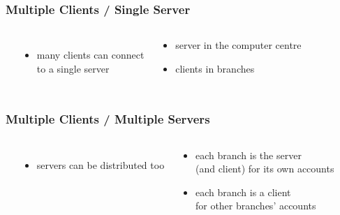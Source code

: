 \documentclass[dvipsnames]{beamer}
\theoremstyle{plain}
\begin{document}
\begin{frame}
  \frametitle{Multiple Clients / Single Server}

  \begin{columns}
    \begin{center}
    \end{center}

    \begin{itemize}
      \item many clients can connect\\
	to a single server
    \end{itemize}

    \pause
    \bigskip
    \begin{example}[Bank]
      \begin{itemize}
        \item server in the computer centre
        \item clients in branches
      \end{itemize}
    \end{example}
  \end{columns}
\end{frame}

\begin{frame}
  \frametitle{Multiple Clients / Multiple Servers}

  \begin{columns}
    \begin{center}
    \end{center}

    \begin{itemize}
      \item servers can be distributed too
    \end{itemize}

    \pause
    \bigskip
    \begin{example}[Bank]
      \begin{itemize}
        \item each branch is the server\\
	  (and client) for its own accounts
        \item each branch is a client\\
	  for other branches' accounts
      \end{itemize}
    \end{example}
  \end{columns}
\end{frame}
\end{document}
